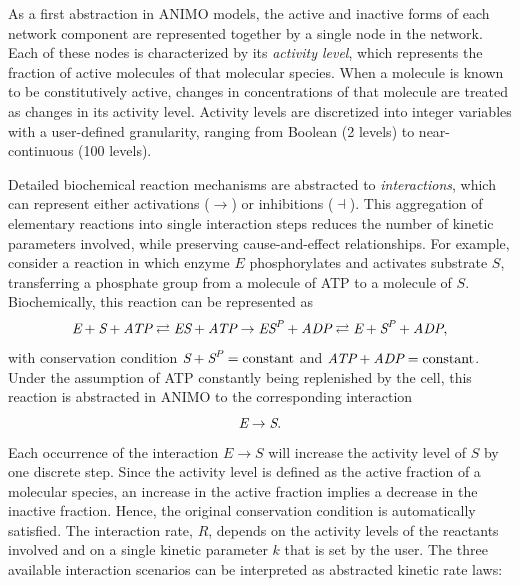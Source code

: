 \documentclass{bmcart}
\begin{document}
As a first abstraction in ANIMO models, the active and inactive forms of each network component 
are represented together by a single node in the network.
Each of these nodes is characterized by its \emph{activity level}, which
represents the fraction of active molecules of that molecular species. When a molecule is known to be 
constitutively active, changes in concentrations of that molecule are treated as changes in its activity level.
Activity levels are discretized into integer variables with a user-defined granularity, ranging from 
Boolean (2 levels) to near-continuous (100 levels).

Detailed biochemical reaction mechanisms are abstracted to \emph{interactions}, which can 
represent either activations ($\rightarrow$) or inhibitions ($\dashv$\hspace{0.1em}). 
This aggregation of elementary reactions into single interaction steps reduces the number of kinetic 
parameters involved, while preserving cause-and-effect relationships.
For example, consider a reaction in which enzyme $E$ phosphorylates and activates substrate $S$, 
transferring a phosphate group from a molecule of ATP to a molecule of $S$. Biochemically, this reaction 
can be represented as
$$
\mbox{\it E} + \mbox{\it S} + \mbox{\it ATP} \rightleftarrows \mbox{\it ES} + \mbox{\it ATP} \rightarrow \mbox{\it ES}^{\mbox{\scriptsize \it P}} + \mbox{\it ADP} \rightleftarrows \mbox{\it E} + \mbox{\it S}^{\mbox{\scriptsize\it P}} + \mbox{\it ADP},
$$
with conservation condition $\mbox{\it S} + \mbox{\it S}^{\mbox{\scriptsize\it P}} = \mbox{constant}$ and $\mbox{\it ATP} + \mbox{\it ADP} = \mbox{constant}$.\\
Under the assumption of ATP constantly being replenished by the cell, this reaction is abstracted in ANIMO to the corresponding interaction
$$
\mbox{\it E} \rightarrow \mbox{\it S}.
$$
Each occurrence of the interaction $E \rightarrow S$ will increase the activity level of $S$ by one discrete step. 
Since the activity level is defined as the active fraction of a molecular species, an increase in the active fraction
implies a decrease in the inactive fraction. Hence, the original conservation condition is automatically  
satisfied.
The interaction rate, $R$, depends on the activity levels of the reactants involved and on a single kinetic
parameter $k$ that is set by the user. 
The three available interaction scenarios can be interpreted as abstracted kinetic rate laws:
\end{document}
